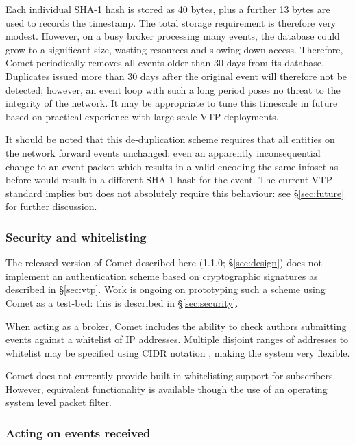 \documentclass[5p,authoryear]{elsarticle}
\begin{document}
Each individual SHA-1 hash is stored as 40 bytes, plus a further 13 bytes are
used to records the timestamp. The total storage requirement is therefore very
modest. However, on a busy broker processing many events, the database could
grow to a significant size, wasting resources and slowing down access.
Therefore, Comet periodically removes all events older than 30 days from its
database. Duplicates issued more than 30 days after the original event will
therefore not be detected; however, an event loop with such a long period
poses no threat to the integrity of the network. It may be appropriate to tune
this timescale in future based on practical experience with large scale VTP
deployments.

It should be noted that this de-duplication scheme requires that all entities
on the network forward events unchanged: even an apparently inconsequential
change to an event packet which results in a valid encoding the same infoset
as before would result in a different SHA-1 hash for the event. The current
VTP standard implies but does not absolutely require this behaviour: see
\S\ref{sec:future} for further discussion.

\subsubsection{Security and whitelisting}
\label{sec:design:security}

The released version of Comet described here (1.1.0; \S\ref{sec:design}) does
not implement an authentication scheme based on cryptographic signatures as
described in \S\ref{sec:vtp}. Work is ongoing on prototyping such a scheme
using Comet as a test-bed: this is described in \S\ref{sec:security}.

When acting as a broker, Comet includes the ability to check authors
submitting events against a whitelist of IP addresses. Multiple disjoint
ranges of addresses to whitelist may be specified using CIDR notation
\citep{Fuller:1993}, making the system very flexible.

Comet does not currently provide built-in whitelisting support for
subscribers. However, equivalent functionality is available though the use of
an operating system level packet filter.

\subsubsection{Acting on events received}
\label{sec:design:plugin}
\end{document}
